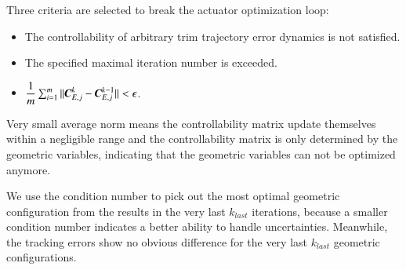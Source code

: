 Three criteria are selected to break the actuator optimization loop:
\begin{itemize}
\item The controllability of arbitrary trim trajectory error dynamics is not satisfied.
\item The specified maximal iteration number is exceeded.
\item $\dfrac{1}{m}\sum^{m}_{i=1}||\emph{\textbf{C}}_{E,j}^{k}-\emph{\textbf{C}}_{E,j}^{k-1}|| < \epsilon$.
\end{itemize}

Very small average norm means the controllability matrix update themselves within a negligible range and the controllability matrix is only determined by the geometric variables, indicating that the geometric variables can not be optimized anymore.

We use the condition number to pick out the most optimal geometric configuration from the results in the very last $k_{last}$ iterations, because a smaller condition number indicates a better ability to handle uncertainties. Meanwhile, the tracking errors show no obvious difference for the very last $k_{last}$ geometric configurations.

